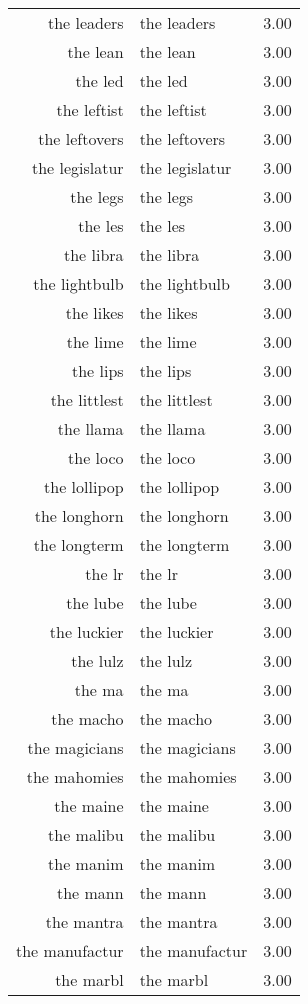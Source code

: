 \begin{table}[ht]
\begin{tabular}{rlr}
  the leaders & the leaders & 3.00 \\ 
  the lean & the lean & 3.00 \\ 
  the led & the led & 3.00 \\ 
  the leftist & the leftist & 3.00 \\ 
  the leftovers & the leftovers & 3.00 \\ 
  the legislatur & the legislatur & 3.00 \\ 
  the legs & the legs & 3.00 \\ 
  the les & the les & 3.00 \\ 
  the libra & the libra & 3.00 \\ 
  the lightbulb & the lightbulb & 3.00 \\ 
  the likes & the likes & 3.00 \\ 
  the lime & the lime & 3.00 \\ 
  the lips & the lips & 3.00 \\ 
  the littlest & the littlest & 3.00 \\ 
  the llama & the llama & 3.00 \\ 
  the loco & the loco & 3.00 \\ 
  the lollipop & the lollipop & 3.00 \\ 
  the longhorn & the longhorn & 3.00 \\ 
  the longterm & the longterm & 3.00 \\ 
  the lr & the lr & 3.00 \\ 
  the lube & the lube & 3.00 \\ 
  the luckier & the luckier & 3.00 \\ 
  the lulz & the lulz & 3.00 \\ 
  the ma & the ma & 3.00 \\ 
  the macho & the macho & 3.00 \\ 
  the magicians & the magicians & 3.00 \\ 
  the mahomies & the mahomies & 3.00 \\ 
  the maine & the maine & 3.00 \\ 
  the malibu & the malibu & 3.00 \\ 
  the manim & the manim & 3.00 \\ 
  the mann & the mann & 3.00 \\ 
  the mantra & the mantra & 3.00 \\ 
  the manufactur & the manufactur & 3.00 \\ 
  the marbl & the marbl & 3.00 \\ 

\end{tabular}
\end{table}
